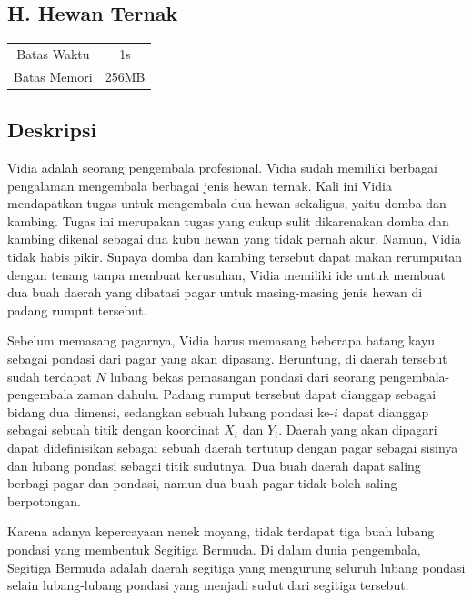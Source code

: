 \documentclass{article}
\begin{document}
\begin{center}
    \section*{H. Hewan Ternak} %

    \begin{tabular}{ | c c | }
        \hline
        Batas Waktu  & 1s \\    %
        Batas Memori & 256MB \\  %
        \hline
    \end{tabular}
\end{center}

\subsection*{Deskripsi}
Vidia adalah seorang pengembala profesional. Vidia sudah memiliki berbagai pengalaman mengembala berbagai jenis hewan ternak. Kali ini Vidia mendapatkan tugas untuk mengembala dua hewan sekaligus, yaitu domba dan kambing. Tugas ini merupakan tugas yang cukup sulit dikarenakan domba dan kambing dikenal sebagai dua kubu hewan yang tidak pernah akur. Namun, Vidia tidak habis pikir. Supaya domba dan kambing tersebut dapat makan rerumputan dengan tenang tanpa membuat kerusuhan, Vidia memiliki ide untuk membuat dua buah daerah yang dibatasi pagar untuk masing-masing jenis hewan di padang rumput tersebut. 

Sebelum memasang pagarnya, Vidia harus memasang beberapa batang kayu sebagai pondasi dari pagar yang akan dipasang. Beruntung, di daerah tersebut sudah terdapat $N$ lubang bekas pemasangan pondasi dari seorang pengembala-pengembala zaman dahulu. Padang rumput tersebut dapat dianggap sebagai bidang dua dimensi, sedangkan sebuah lubang pondasi ke-$i$ dapat dianggap sebagai sebuah titik dengan koordinat $X_i$ dan $Y_i$. Daerah yang akan dipagari dapat didefinisikan sebagai sebuah daerah tertutup dengan pagar sebagai sisinya dan lubang pondasi sebagai titik sudutnya. Dua buah daerah dapat saling berbagi pagar dan pondasi, namun dua buah pagar tidak boleh saling berpotongan. 

Karena adanya kepercayaan nenek moyang, tidak terdapat tiga buah lubang pondasi yang membentuk Segitiga Bermuda. Di dalam dunia pengembala, Segitiga Bermuda adalah daerah segitiga yang mengurung seluruh lubang pondasi selain lubang-lubang pondasi yang menjadi sudut dari segitiga tersebut. 
\end{document}
